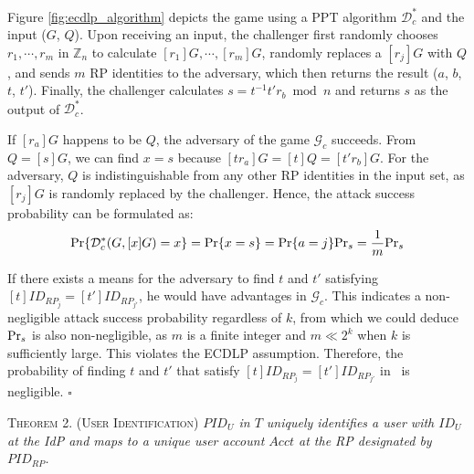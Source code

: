 Figure \ref{fig:ecdlp_algorithm} depicts the game %
using a PPT algorithm $\mathcal{D}^*_c$ and the input ($G$, $Q$).
Upon receiving an input, the challenger first randomly chooses $r_1, \cdots, r_m$ in $\mathbb{Z}_n$ to calculate $[r_1]G, \cdots, [r_m]G$, randomly replaces a $[r_j]G$ with $Q$, and sends $m$ RP identities to the adversary, which then returns the result ($a$, $b$, $t$, $t'$).
Finally, the challenger calculates $s = t^{-1}t'r_b \bmod n$ and returns $s$ as the output of $\mathcal{D}^*_c$.

If $[r_a]G$ happens to be $Q$, the adversary of the game $\mathcal{G}_c$ succeeds. From $Q = [s]G$, we can find $x=s$ because $[tr_a]G = [t]Q = [t'r_b]G$. For the adversary, $Q$ is indistinguishable from any other RP identities in the input set, as $[r_j]G$ is randomly replaced by the challenger. Hence, the attack success probability can be formulated as:
\begin{equation*}
{\rm Pr}\{\mathcal{D}^*_c(G, [x]G)=x\} = {\rm Pr}\{x = s\}={\rm Pr}\{a=j\}{\rm Pr}_s=\frac{1}{m}{\rm Pr}_s
\end{equation*}

\newc
If there exists a means for the adversary to find $t$ and $t'$ satisfying $[t]ID_{RP_j} = [t']ID_{RP_{j'}}$, he would have advantages in $\mathcal{G}_c$. This indicates a non-negligible attack success probability regardless of $k$, from which we could deduce ${\rm Pr}_s$ is also non-negligible, as $m$ is a finite integer and $m \ll 2^k$ when $k$ is sufficiently large.
\oldc
This violates the ECDLP assumption. Therefore, the probability of finding $t$ and $t'$ that satisfy $[t]ID_{RP_j} = [t']ID_{RP_{j'}}$ in \usso~is negligible. \hfill $\square$


\newc
\vspace{1mm}
\noindent\textsc{Theorem 2. (User Identification)} {\em $PID_U$ in $T$ uniquely identifies a user with $ID_U$ at the IdP and maps to a unique user account $Acct$ at the RP designated by $PID_{RP}$.}


